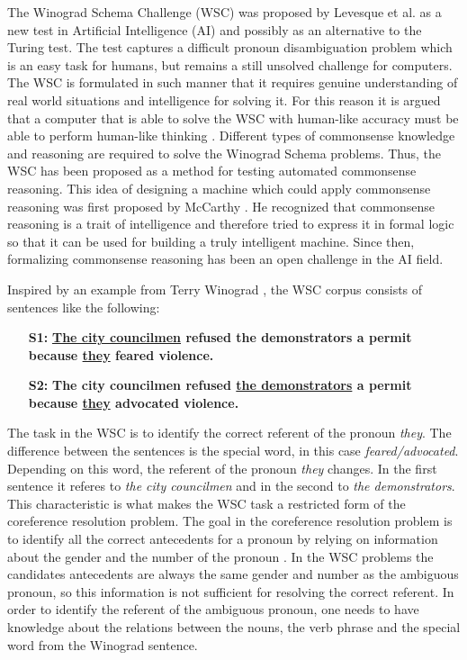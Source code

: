 \label{section:introduction}

The Winograd Schema Challenge (WSC) was proposed by Levesque et al. \cite{DBLP:conf/kr/LevesqueDM12} as a new test in Artificial Intelligence (AI) and possibly as an alternative to the Turing test. The test captures a difficult pronoun disambiguation problem which is an easy task for humans, but remains a still unsolved challenge for computers. The WSC is formulated in such manner that it requires genuine understanding of real world situations and intelligence for solving it. For this reason it is argued that a computer that is able to solve the WSC with human-like accuracy must be able to perform human-like thinking \cite{DBLP:conf/kr/LevesqueDM12}. 
Different types of commonsense knowledge and reasoning are required to solve the Winograd Schema problems. Thus, the WSC has been proposed as a method for testing automated commonsense reasoning. This idea of designing a  machine which could apply commonsense reasoning was first proposed by McCarthy \cite{McCarthy:1960:PCS:889202}. He recognized that commonsense reasoning is a trait of intelligence and therefore tried to express it in formal logic so that it can be used for building a truly intelligent machine. Since then, formalizing commonsense reasoning has been an open challenge in the AI field.   

Inspired by an example from Terry Winograd \cite{article}, the WSC corpus consists of sentences like the following:
\begin{itemize}
	\item[\textbf{S1:}] \textbf{\underline{The city councilmen} refused the demonstrators a permit because \underline{they} feared violence.}
	\item[\textbf{S2:}] \textbf{The city councilmen refused \underline{the demonstrators} a permit because \underline{they} advocated violence.}
\end{itemize}

The task in the WSC is to identify the correct referent of the pronoun \textit{they}. The difference between the sentences is the special word, in this case \textit{feared/advocated}. Depending on this word, the referent of the pronoun \textit{they} changes. In the first sentence it referes to \textit{the city councilmen} and in the second to \textit{the demonstrators}. This characteristic is what makes the WSC task a restricted form of the coreference resolution problem. The goal in the coreference resolution problem is to identify all the correct antecedents for a pronoun by relying on information about the gender and the number of the pronoun \cite{Coref}. In the WSC problems the candidates antecedents are always the same gender and number as the ambiguous pronoun, so this information is not sufficient for resolving the correct referent.
In order to identify the referent of the ambiguous pronoun, one needs to have knowledge about the relations between the nouns, the verb phrase and the special word from the Winograd sentence.

